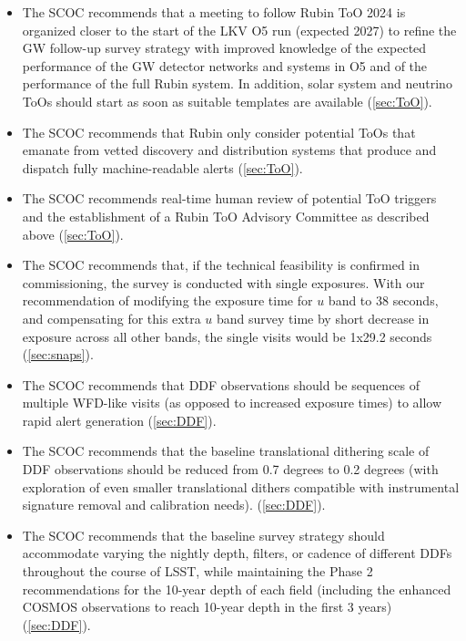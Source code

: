 \begin{itemize}
\item The SCOC recommends that a meeting to follow Rubin ToO 2024 is organized closer to the start of the LKV O5 run (expected 2027) to refine the GW follow-up survey strategy with improved knowledge of the expected performance of the GW detector networks and systems in O5 and of the performance of the full Rubin system. In addition, solar system and neutrino ToOs should start as soon as suitable templates are available (\autoref{sec:ToO}).

\item The SCOC recommends that Rubin only consider potential ToOs that emanate from vetted discovery and distribution systems that produce and dispatch fully machine-readable alerts (\autoref{sec:ToO}).

\item The SCOC recommends real-time human review of potential ToO triggers and the establishment of a Rubin ToO Advisory Committee as described above (\autoref{sec:ToO}).

\item The SCOC recommends that, if the technical feasibility is confirmed in commissioning, the survey is conducted with single exposures. With our recommendation of modifying the exposure time for $u$ band to 38 seconds, and compensating for this extra $u$ band survey time by short decrease in exposure across all other bands, the single visits would be 1x29.2 seconds (\autoref{sec:snaps}).

\item The SCOC recommends that DDF observations should be sequences of multiple WFD-like visits (as opposed to increased exposure times) to allow rapid alert generation (\autoref{sec:DDF}).

\item The SCOC recommends that the baseline translational dithering scale of DDF observations should be reduced from 0.7 degrees to 0.2 degrees (with exploration of even smaller translational dithers compatible with instrumental signature removal and calibration needs). (\autoref{sec:DDF}).

\item The SCOC recommends that the baseline survey strategy should accommodate varying the nightly depth, filters, or cadence of different DDFs throughout the course of LSST, while maintaining the Phase 2 recommendations for the 10-year depth of each field (including the enhanced COSMOS observations to reach 10-year depth in the first 3 years) (\autoref{sec:DDF}).


\end{itemize}
